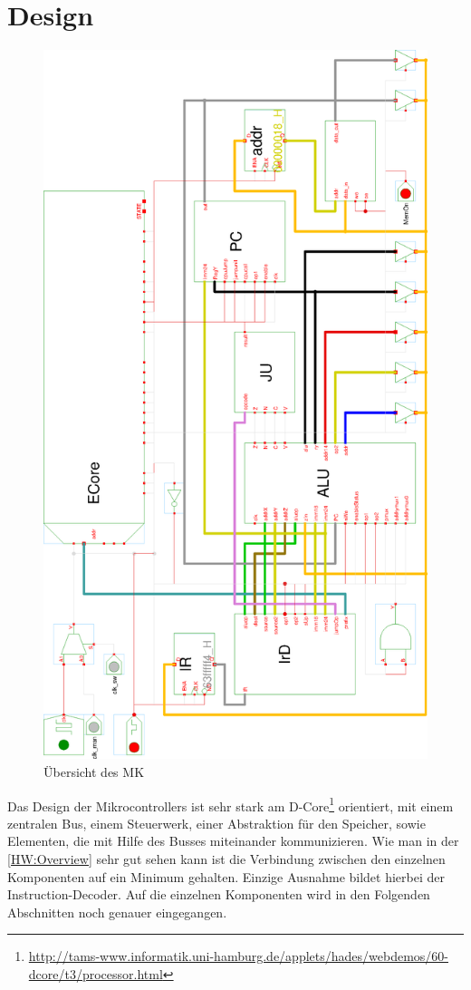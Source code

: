\section{Design}
\begin{figure}
\vspace{-4em}
\centering
\includegraphics[width=.8\textwidth]{images/overview.eps}
\caption{\label{HW:Overview}Übersicht des MK}
\end{figure}
Das Design der Mikrocontrollers ist sehr stark am D-Core\footnote{\url{http://tams-www.informatik.uni-hamburg.de/applets/hades/webdemos/60-dcore/t3/processor.html}} orientiert, mit einem zentralen Bus, einem Steuerwerk, einer Abstraktion für den Speicher, sowie Elementen, die mit Hilfe des Busses miteinander kommunizieren. Wie man in der \autoref{HW:Overview} sehr gut sehen kann ist die Verbindung zwischen den einzelnen Komponenten auf ein Minimum gehalten. Einzige Ausnahme bildet hierbei der Instruction-Decoder. Auf die einzelnen Komponenten wird in den Folgenden Abschnitten noch genauer eingegangen.\\
